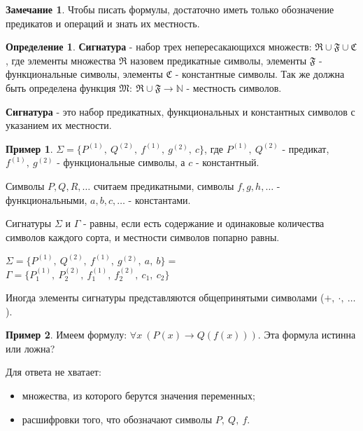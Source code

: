 \documentclass{report}
\theoremstyle{definition}
\newtheorem{definition}{Определение}[section]
\newtheorem{example}{Пример}
\newtheorem*{remark}{Замечание}
\begin{document}
\begin{remark}
    Чтобы писать формулы, достаточно иметь только обозначение предикатов и операций и знать их местность.
\end{remark}

\begin{definition}
    \textbf{Сигнатура} - набор трех непересакающихся множеств: $\mathfrak{R} \cup \mathfrak{F} \cup \mathfrak{C}$, где элементы множества $\mathfrak{R}$ назовем предикатные символы, элементы $\mathfrak{F}$ - функциональные символы, элементы $\mathfrak{C}$ - константные символы. Так же должна быть определена функция $\mathfrak{M}: \ \mathfrak{R} \cup \mathfrak{F} \rightarrow \mathbb{N}$ - местность символов. 

    \textbf{Сигнатура} - это набор предикатных, функциональных и константных символов с указанием их местности.
\end{definition}

\begin{example}
    $\Sigma = \{P^{(1)}, \ Q^{(2)}, \ f^{(1)}, \ g^{(2)}, \ c\}$, где $P^{(1)}, \ Q^{(2)}$ - предикат, $f^{(1)}, \ g^{(2)}$ - функциональные символы, а $c$ - константный.
\end{example}

Символы $P, Q, R, \ldots$ считаем предикатными, символы $f, g, h, \ldots$ - функциональными, $a, b, c, \ldots$ - константами.

Сигнатуры $\Sigma$ и $\Gamma$ - равны, если есть содержание и одинаковые количества символов каждого сорта, и местности символов попарно равны.
\begin{center}
    $\Sigma = \{P^{(1)}, \ Q^{(2)}, \ f^{(1)}, \ g^{(2)}, \ a, \ b\} =$ \\

    $\Gamma = \{P_1^{(1)}, \ P_2^{(2)}, \ f_1^{(1)}, \ f_2^{(2)}, \ c_1, \ c_2\}$
\end{center}

Иногда элементы сигнатуры представляются общепринятыми символами ($+, \ \cdot, \ \ldots$).

\begin{example}
    Имеем формулу: $\forall x \ (P(x) \rightarrow Q(f(x)))$. Эта формула истинна или ложна?

    Для ответа не хватает:
    \begin{itemize}
        \item множества, из которого берутся значения переменных;
        \item расшифровки того, что обозначают символы $P, \ Q, \ f$.
    \end{itemize}
\end{example}
\end{document}
